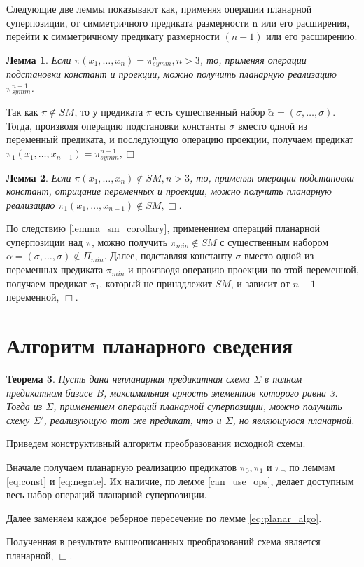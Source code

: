 \documentclass[12pt]{extarticle}
\newtheorem{theorem}{Теорема}[section]
\newtheorem{lemma}[theorem]{Лемма}
\newenvironment{proof}[1][Доказательство.]{\begin{trivlist}
\item[\hskip \labelsep {\bfseries #1}]}{\end{trivlist}}
\begin{document}
Следующие две леммы показывают как, применяя операции планарной суперпозиции, от симметричного предиката
размерности n или его расширения, перейти к симметричному предикату размерности $(n-1)$ или его расширению.

\begin{lemma}
\label{eq:svedenie1}
Если $\pi(x_1, \dots, x_n) = \pi_{symm}^n, n > 3$, то, 
применяя операции подстановки констант и проекции, можно получить планарную реализацию $\pi_{symm}^{n-1}$.
\end{lemma}

\begin{proof}
Так как 
$\pi \notin SM$, то у предиката $\pi$ есть существенный набор $\widetilde{\alpha} = (\sigma, \dots, \sigma)$.
Тогда, производя операцию подстановки константы $\sigma$ вместо одной из переменный предиката, и последующую 
операцию проекции, получаем предикат $\pi_1(x_1, \dots, x_{n-1}) = \pi_{symm}^{n-1}, \Box$
\end{proof}

\begin{lemma}
\label{eq:svedenie2}
Если $\pi(x_1, \dots, x_n) \notin SM, n > 3$, то, применяя операции подстановки констант, отрицание переменных и 
проекции, можно получить планарную реализацию $\pi_1(x_1, \dots, x_{n-1}) \notin SM, \Box$.
\end{lemma}

\begin{proof}
По следствию \ref{lemma_sm_corollary}, применением операций планарной суперпозиции над $\pi$, можно получить 
$\pi_{min} \notin SM$ с существенным набором $\alpha=(\sigma, \dots, \sigma) \notin \Pi_{min}$. 
Далее, подставляя константу $\sigma$ вместо одной из переменных предиката $\pi_{min}$ и производя операцию проекции по
этой переменной, получаем предикат $\pi_1$, который
не принадлежит $SM$, и зависит от $n-1$ переменной, $\Box$.
\end{proof}

\section{Алгоритм планарного сведения}

\begin{theorem}
\label{Theo1}
Пусть дана непланарная предикатная схема $\Sigma$ в полном предикатном базисе $B$, максимальная
арность элементов которого равна 3.
Тогда из $\Sigma$, применением операций планарной суперпозиции, можно получить схему $\Sigma'$,
реализующую тот же предикат, что и $\Sigma$, но являющуюся планарной.
\end{theorem}
\begin{proof}
Приведем конструктивный алгоритм преобразования исходной схемы.

Вначале получаем планарную реализацию предикатов $\pi_0, \pi_1$ и $\pi_{\neg}$ 
по леммам \ref{eq:const} и \ref{eq:negate}. Их наличие, по лемме \ref{can_use_ops},
делает доступным весь набор операций планарной суперпозиции. 

Далее заменяем каждое реберное пересечение по лемме \ref{eq:planar_algo}. 

Полученная в результате вышеописанных преобразований схема является планарной, $\Box$.
\end{proof}
\end{document}
